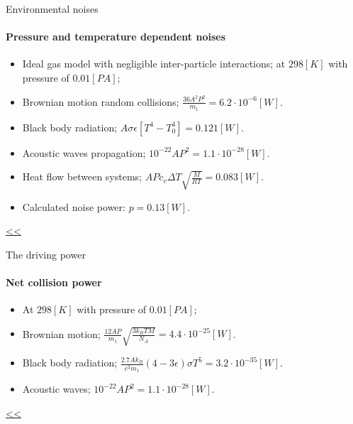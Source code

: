 \documentclass{beamer}
\begin{document}
\begin{frame}{\hypertarget{frame:Environmental noises 1}{Environmental noises}}
	\framesubtitle{Pressure and temperature dependent noises}
	\begin{itemize}
		\item Ideal gas model with negligible inter-particle interactions; at $298[K]$ with pressure of $0.01[PA]$;

		\item Brownian motion random collisions; $\frac{36A^2P^2}{m_1}=6.2\cdot 10^{-6}[W]$. 
		\item Black body radiation; $A \sigma\epsilon[ T^4- T_0^4]=0.121[W]$.
		\item Acoustic waves propagation; $10^{-22}AP^2=1.1\cdot 10^{-28}[W]$.
		\item Heat flow between systems; $A P c_v \Delta T \sqrt{\frac{M}{RT}} =0.083[W]$.
		\item Calculated noise power: $p=0.13 [W]$.

		
	\end{itemize}
	\hyperlink{frame:Environmental noises}{<<} 
\end{frame}


\begin{frame}{\hypertarget{frame:The driving power 1}{The driving power}}
	\framesubtitle{Net collision power}
	\begin{itemize}	
		\item At $298[K]$ with pressure of $0.01[PA]$;
		\item Brownian motion; $\frac{12AP}{m_1}\sqrt{\frac{3 k_B T M}{ N_A }}=4.4\cdot 10^{-25}  [W]$. 
		\item Black body radiation; $\frac{2.7A k_B}{ c^2 m_1} (4-3\epsilon)\sigma T^5=3.2\cdot 10^{-35}[W]$.
		\item Acoustic waves; $10^{-22}AP^2=1.1\cdot 10^{-28}[W]$.
					
	\end{itemize}
	\hyperlink{frame:The driving power}{<<} 
\end{frame}
\end{document}
